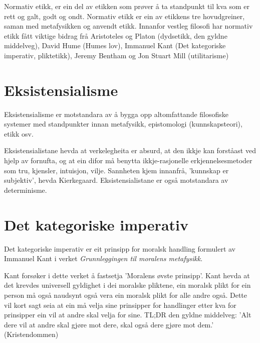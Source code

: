 \documentclass[a4paper]{IEEEtran}
\begin{document}
Normativ etikk, er ein del av etikken som prøver å ta standpunkt til kva som er rett og galt, godt og ondt. Normativ etikk er ein av etikkens tre hovudgreiner, saman med metafysikken og anvendt etikk. Innanfor vestleg filosofi har normativ etikk fått viktige bidrag frå Aristoteles og Platon (dydsetikk, den gyldne middelveg), David Hume (Humes lov), Immanuel Kant (Det kategoriske imperativ, pliktetikk), Jeremy Bentham og Jon Stuart Mill (utilitarisme)
\bigskip

\section{Eksistensialisme}
\label{eksistensialisme}\bigskip

Eksistensialisme er motstandara av å bygga opp altomfattande filosofiske systemer med standpunkter innan metafysikk, epistomologi (kunnskapsteori), etikk osv.\newline

Eksistensialistane hevda at verkelegheita er absurd, at den ikkje kan forståast ved hjelp av fornufta, og at ein difor må benytta ikkje-rasjonelle erkjennelsesmetoder som tru, kjensler, intuisjon, vilje. Sannheten kjem innanfrå, 'kunnskap er subjektiv', hevda Kierkegaard. Eksistensialistane er også motstandara av determinisme. 

\bigskip
\section{Det kategoriske imperativ}
\label{detkategoriskeimperativ}\bigskip

Det kategoriske imperativ er eit prinsipp for moralsk handling formulert av Immanuel Kant i verket \textit{Grunnleggingen til moralens metafysikk}.\bigskip

Kant forsøker i dette verket å fastsetja 'Moralens øvste prinsipp'. Kant hevda at det krevdes universell gyldighet i dei moralske pliktene, ein moralsk plikt for ein person må også naudsynt også vera ein moralsk plikt for alle andre også. Dette vil kort sagt seia at ein må velja sine prinsipper for handlinger etter kva for prinsipper ein vil at andre skal velja for sine. TL;DR den gyldne middelveg: 'Alt dere vil at andre skal gjøre mot dere, skal også dere gjøre mot dem.' (Kristendommen)


\end{document}
